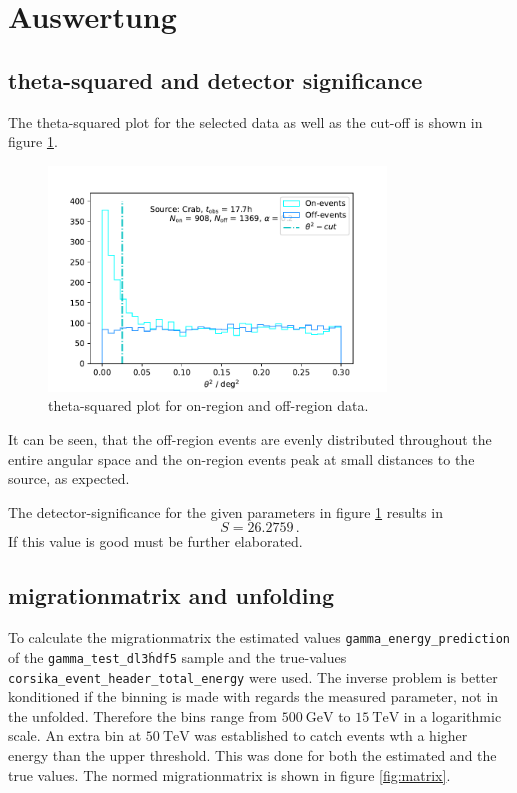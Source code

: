 \section{Auswertung}
\label{sec:auswertung}

\subsection{theta-squared and detector significance}

The theta-squared plot for the selected data as well as the cut-off is shown in figure \ref{fig:onoff}.
\begin{figure}
  \centering
  \includegraphics[width=0.8\textwidth]{plots/On_Off.pdf}
  \caption{theta-squared plot for on-region and off-region data.}
  \label{fig:onoff}
\end{figure}

It can be seen, that the off-region events are evenly distributed throughout the entire angular space and the on-region events peak at small distances to the source, as expected.

The detector-significance for the given parameters in figure \ref{fig:onoff} results in
\begin{equation}
  S = 26.2759\,.
\end{equation}
If this value is good must be further elaborated.

\subsection{migrationmatrix and unfolding}
To calculate the migrationmatrix the estimated values  \texttt{gamma\_energy\_prediction} of the \texttt{gamma\_test\_dl3\.hdf5} sample and the true-values \texttt{corsika\_event\_header\_total\_energy} were used.
The inverse problem is better konditioned if the binning is made with regards the measured parameter, not in the unfolded.
Therefore the bins range from $\SI{500}{\giga\electronvolt}$ to $\SI{15}{\tera\electronvolt}$ in a logarithmic scale. An extra bin at $\SI{50}{\tera\electronvolt}$ was established to catch events wth a higher energy than the upper threshold.
This was done for both the estimated and the true values. The normed migrationmatrix is shown in figure \ref{fig:matrix}.

